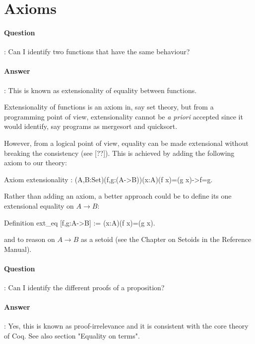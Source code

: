 \documentclass{article}
\begin{document}
\section{Axioms}

\paragraph{Question}: Can I identify two functions that have the same behaviour?

\paragraph{Answer}: This is known as extensionality of equality
between functions.

Extensionality of functions is an axiom in, say set theory, but from a
programming point of view, extensionality cannot be {\em a priori}
accepted since it would identify, say programs as mergesort and
quicksort.

However, from a logical point of view, equality can be made
extensional without breaking the consistency (see [??]). This is
achieved by adding the following axiom to our theory:

\begin{coq_example*}
  Axiom extensionality : (A,B:Set)(f,g:(A->B))(x:A)(f x)=(g x)->f=g.
\end{coq_example*}

Rather than adding an axiom, a better approach could be to define
its one extensional equality on $A \rightarrow B$:

\begin{coq_example*}
  Definition ext_eq [f,g:A->B] := (x:A)(f x)=(g x).
\end{coq_example*}

and to reason on $A \rightarrow B$ as a setoid (see the Chapter on Setoids in the
Reference Manual).


\paragraph{Question}: Can I identify the different proofs of a proposition?

\paragraph{Answer}: Yes, this is known as proof-irrelevance and it is consistent with
the core theory of Coq. See also section "Equality on terms".
\end{document}
